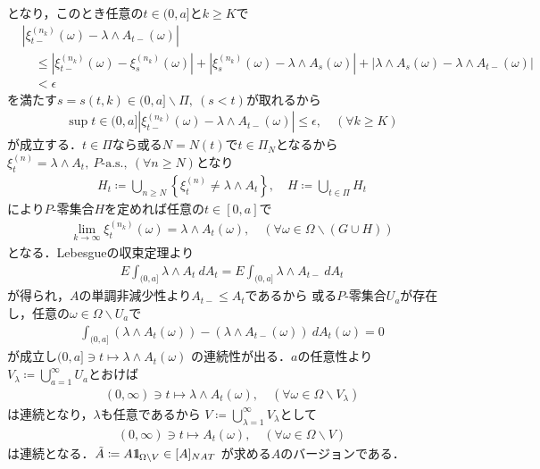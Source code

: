 \begin{prf}
\begin{description}
				となり，このとき任意の$t \in (0,a]$と$k \geq K$で
				\begin{align}
					&\left|\xi^{(n_k)}_{t-}(\omega) - \lambda \wedge A_{t-}(\omega)\right| \\
					&\quad \leq \left|\xi^{(n_k)}_{t-}(\omega) - \xi^{(n_k)}_{s}(\omega)\right|
						+ \left|\xi^{(n_k)}_{s}(\omega) - \lambda \wedge A_{s}(\omega)\right|
						+ \left|\lambda \wedge A_{s}(\omega) - \lambda \wedge A_{t-}(\omega)\right| \\
					&\quad < \epsilon
				\end{align}
				を満たす$s = s(t,k) \in (0,a]\backslash\Pi,\ (s < t)$が取れるから
				\begin{align}
					\sup{t \in (0,a]}{\left|\xi^{(n_k)}_{t-}(\omega) - \lambda \wedge A_{t-}(\omega)\right|} 
					\leq \epsilon,\quad (\forall k \geq K)
				\end{align}
				が成立する．$t \in \Pi$なら或る$N = N(t)$で$t \in \Pi_N$となるから
				$\xi^{(n)}_t = \lambda \wedge A_t,\ \mbox{$P$-a.s.},\ (\forall n \geq N)$となり
				\begin{align}
					H_t \coloneqq \bigcup_{n \geq N} \left\{\xi^{(n)}_t \neq \lambda \wedge A_t\right\},
					\quad H \coloneqq \bigcup_{t \in \Pi} H_t
				\end{align}
				により$P$-零集合$H$を定めれば任意の$t \in [0,a]$で
				\begin{align}
					\lim_{k \to \infty} \xi^{(n_k)}_t(\omega) = \lambda \wedge A_t(\omega),
					\quad (\forall \omega \in \Omega \backslash (G \cup H))
				\end{align}
				となる．Lebesgueの収束定理より
				\begin{align}
					E\int_{(0,a]} \lambda \wedge A_t\ dA_t
					= E\int_{(0,a]} \lambda \wedge A_{t-}\ dA_t
				\end{align}
				が得られ，$A$の単調非減少性より$A_{t-} \leq A_t$であるから
				或る$P$-零集合$U_a$が存在し，任意の$\omega \in \Omega \backslash U_a$で
				\begin{align}
					\int_{(0,a]} (\lambda \wedge A_t(\omega)) 
					- (\lambda \wedge A_{t-}(\omega))\ dA_t(\omega) = 0
				\end{align}
				が成立し$(0,a] \ni t \longmapsto \lambda \wedge A_t(\omega)$
				の連続性が出る．$a$の任意性より
				$V_\lambda \coloneqq \bigcup_{a=1}^\infty U_a$とおけば
				\begin{align}
					(0,\infty) \ni t \longmapsto \lambda \wedge A_t(\omega),
					 \quad (\forall \omega \in \Omega \backslash V_\lambda)
				\end{align}
				は連続となり，$\lambda$も任意であるから
				$V \coloneqq \bigcup_{\lambda=1}^\infty V_\lambda$として
				\begin{align}
					(0,\infty) \ni t \longmapsto A_t(\omega),
					\quad (\forall \omega \in \Omega \backslash V)
				\end{align}
				は連続となる．$\tilde{A} \coloneqq A \mbox{1}\hspace{-0.25em}\mbox{l}_{\Omega \backslash V} \in [A]_{NAT}$
				が求める$A$のバージョンである．
				\QED
		\end{description}
	\end{prf}
	
